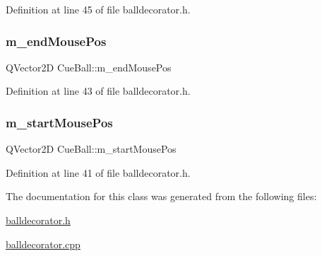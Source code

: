 Definition at line 45 of file balldecorator.\+h.

\mbox{\label{class_cue_ball_a2266dea32739c919dbd7848167536a4e}} 
\subsubsection{\texorpdfstring{m\+\_\+end\+Mouse\+Pos}{m\_endMousePos}}
{\footnotesize\ttfamily Q\+Vector2D Cue\+Ball\+::m\+\_\+end\+Mouse\+Pos\hspace{0.3cm}{\ttfamily [protected]}}



Definition at line 43 of file balldecorator.\+h.

\mbox{\label{class_cue_ball_a31c90da6dfe1fcaba9dae9a9860028b9}} 
\subsubsection{\texorpdfstring{m\+\_\+start\+Mouse\+Pos}{m\_startMousePos}}
{\footnotesize\ttfamily Q\+Vector2D Cue\+Ball\+::m\+\_\+start\+Mouse\+Pos\hspace{0.3cm}{\ttfamily [protected]}}



Definition at line 41 of file balldecorator.\+h.



The documentation for this class was generated from the following files\+:\begin{DoxyCompactItemize}
\item 
\mbox{\hyperlink{balldecorator_8h}{balldecorator.\+h}}\item 
\mbox{\hyperlink{balldecorator_8cpp}{balldecorator.\+cpp}}\end{DoxyCompactItemize}
